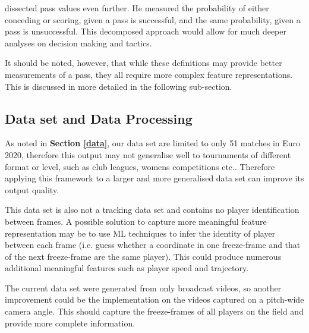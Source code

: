 \documentclass[conference]{IEEEtran}
\begin{document}
\textcite{fernandez2019decomposing} dissected pass values even further. He measured the probability of either conceding or scoring, given a pass is successful, and the same probability, given a pass is unsuccessful. This decomposed approach would allow for much deeper analyses on decision making and tactics.

It should be noted, however, that while these definitions may provide better measurements of a pass, they all require more complex feature representations. This is discussed in more detailed in the following sub-section.

\subsection{Data set and Data Processing}
As noted in \textbf{Section \ref{data}}, our data set are limited to only 51 matches in Euro 2020, therefore this output may not generalise well to tournaments of different format or level, such as club leagues, womens competitions etc.. Therefore applying this framework to a larger and more generalised data set can improve its output quality.

This data set is also not a tracking data set and contains no player identification between frames. A possible solution to capture more meaningful feature representation may be to use ML techniques to infer the identity of player between each frame (i.e. guess whether a coordinate in one freeze-frame and that of the next freeze-frame are the same player). This could produce numerous additional meaningful features such as player speed and trajectory.

The current data set were generated from only broadcast videos, so another improvement could be the implementation on the videos captured on a pitch-wide camera angle. This should capture the freeze-frames of all players on the field and provide more complete information.




\end{document}
